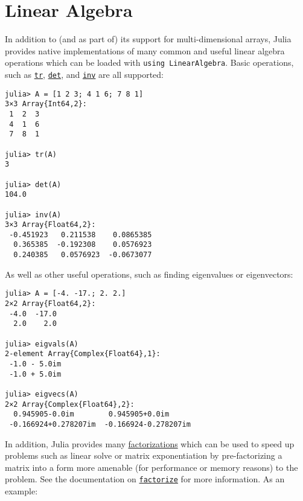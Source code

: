 \hypertarget{15381337092802716678}{}


\chapter{Linear Algebra}





In addition to (and as part of) its support for multi-dimensional arrays, Julia provides native implementations of many common and useful linear algebra operations which can be loaded with \texttt{using LinearAlgebra}. Basic operations, such as \hyperlink{3355659645971312171}{\texttt{tr}}, \hyperlink{16543378577000914469}{\texttt{det}}, and \hyperlink{13336866048543706848}{\texttt{inv}} are all supported:




\begin{verbatim}
julia> A = [1 2 3; 4 1 6; 7 8 1]
3×3 Array{Int64,2}:
 1  2  3
 4  1  6
 7  8  1

julia> tr(A)
3

julia> det(A)
104.0

julia> inv(A)
3×3 Array{Float64,2}:
 -0.451923   0.211538    0.0865385
  0.365385  -0.192308    0.0576923
  0.240385   0.0576923  -0.0673077
\end{verbatim}



As well as other useful operations, such as finding eigenvalues or eigenvectors:




\begin{verbatim}
julia> A = [-4. -17.; 2. 2.]
2×2 Array{Float64,2}:
 -4.0  -17.0
  2.0    2.0

julia> eigvals(A)
2-element Array{Complex{Float64},1}:
 -1.0 - 5.0im
 -1.0 + 5.0im

julia> eigvecs(A)
2×2 Array{Complex{Float64},2}:
  0.945905-0.0im        0.945905+0.0im
 -0.166924+0.278207im  -0.166924-0.278207im
\end{verbatim}



In addition, Julia provides many \hyperlink{14017178414387426770}{factorizations} which can be used to speed up problems such as linear solve or matrix exponentiation by pre-factorizing a matrix into a form more amenable (for performance or memory reasons) to the problem. See the documentation on \hyperlink{7042962205548658937}{\texttt{factorize}} for more information. As an example:




